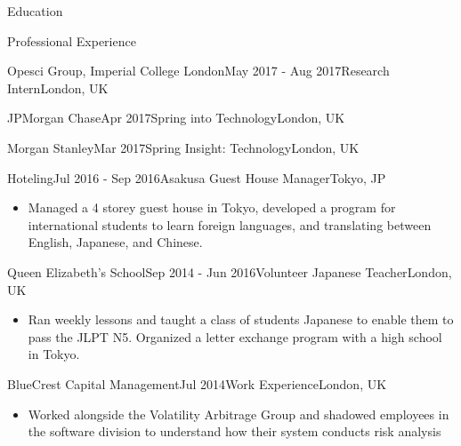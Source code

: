 \documentclass[10pt,a4paper]{article}
\begin{document}
\begin{section}{Education}
\begin{section}{Professional Experience}
\begin{rSubsection}{Opesci Group, Imperial College London}{May 2017 - Aug 2017}{Research Intern}{London, UK}
\begin{rSubsection}{JPMorgan Chase}{Apr 2017}{Spring into Technology}{London, UK}
\begin{rSubsection}{Morgan Stanley}{Mar 2017}{Spring Insight: Technology}{London, UK}

\begin{rSubsection}{Hoteling}{Jul 2016 - Sep 2016}{Asakusa Guest House Manager}{Tokyo, JP}
\begin{itemize}
    \item Managed a 4 storey guest house in Tokyo, developed a program for international students to learn foreign languages, and translating between English, Japanese, and Chinese.
\end{itemize}


\begin{rSubsection}{Queen Elizabeth's School}{Sep 2014 - Jun 2016}{Volunteer Japanese Teacher}{London, UK}
\begin{itemize}
    \item Ran weekly lessons and taught a class of students Japanese to enable them to pass the JLPT N5. Organized a letter exchange program with a high school in Tokyo.
\end{itemize}


\begin{rSubsection}{BlueCrest Capital Management}{Jul 2014}{Work Experience}{London, UK}
\begin{itemize}
    \item Worked alongside the Volatility Arbitrage Group and shadowed employees in the software division to understand how their system conducts risk analysis
\end{itemize}



\end{rSubsection}
\end{rSubsection}
\end{rSubsection}
\end{rSubsection}
\end{rSubsection}
\end{rSubsection}
\end{section}
\end{section}
\end{document}
